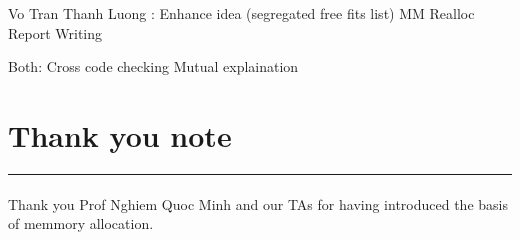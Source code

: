 \documentclass[a4paper]{article}
\newcommand\tab[1][1cm]{\hspace*{#1}}
\begin{document}
Vo Tran Thanh Luong : 
\newline
\tab \tab \tab Enhance idea (segregated free fits list)
\newline
\tab \tab \tab MM Realloc
\newline
\tab \tab \tab Report Writing

Both: 
\newline
\tab \tab \tab Cross code checking
\tab \tab \tab Mutual explaination

\paragraph{}

\section{Thank you note}
\noindent\rule{2cm}{0.4pt}
\paragraph{}
Thank you Prof Nghiem Quoc Minh and our TAs for having introduced the basis of memmory allocation.
\end{document}
